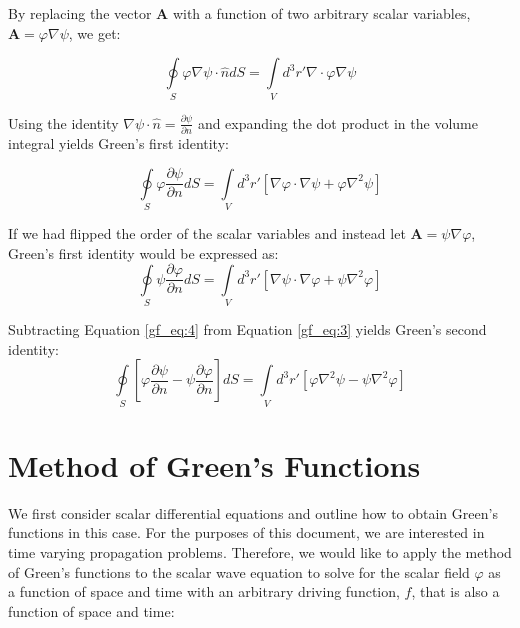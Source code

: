 By replacing the vector $\mathbf{A}$ with a function of two arbitrary scalar variables, $\mathbf{A}=\varphi\nabla\psi$, we get:

\begin{equation}
\oint\limits_{S} \varphi\nabla\psi \cdot \hat{n} dS = \int\limits_{V}d^3r'\nabla \cdot \varphi\nabla\psi
\label{gf_eq:2}
\end{equation}
\renewcommand{\baselinestretch}{2} \small\normalsize

Using the identity $\nabla\psi\cdot \hat{n} = \frac{\partial \psi}{\partial n}$ and expanding the dot product in the volume integral yields Green's first identity:

\begin{equation}
\boxed{\oint\limits_{S} \varphi\frac{\partial \psi}{\partial n} dS = \int\limits_{V}d^3r' \left[ \nabla\varphi \cdot \nabla\psi +\varphi \nabla^2 \psi\right]}
\label{gf_eq:3}
\end{equation}
\renewcommand{\baselinestretch}{2} \small\normalsize

If we had flipped the order of the scalar variables and instead let $\mathbf{A}=\psi\nabla\varphi$, Green's first identity would be expressed as:
\begin{equation}
\oint\limits_{S} \psi\frac{\partial \varphi}{\partial n} dS = \int\limits_{V}d^3r' \left[ \nabla\psi \cdot \nabla\varphi +\psi \nabla^2 \varphi\right]
\label{gf_eq:4}
\end{equation}
\renewcommand{\baselinestretch}{2} \small\normalsize

\noindent Subtracting Equation \ref{gf_eq:4} from Equation \ref{gf_eq:3} yields Green's second identity:
\begin{equation}
\boxed{\oint\limits_{S} \left[ \varphi\frac{\partial \psi}{\partial n} - \psi\frac{\partial \varphi}{\partial n} \right]dS = \int\limits_{V}d^3r' \left[ \varphi\nabla^2\psi- \psi \nabla^2 \varphi\right]}
\label{gf_eq:5}
\end{equation}

\section{Method of Green's Functions} \label{gf_sec:method}
We first consider scalar differential equations and outline how to obtain Green's functions in this case. For the purposes of this document, we are interested in time varying propagation problems. Therefore, we would like to apply the method of Green's functions to the scalar wave equation  to solve for the scalar field $\varphi$ as a function of space and time with an arbitrary driving function, $f$, that is also a function of space and time:

